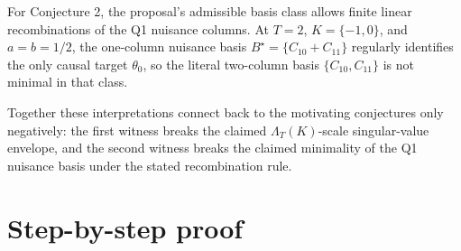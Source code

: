 \documentclass[11pt]{article}
\theoremstyle{definition}
\theoremstyle{plain}
\theoremstyle{remark}
\begin{document}
For Conjecture 2, the proposal's admissible basis class allows finite linear recombinations of the Q1 nuisance columns.
At \(T=2\), \(K=\{-1,0\}\), and \(a=b=1/2\), the one-column nuisance basis \(B^\star=\{C_{10}+C_{11}\}\) regularly identifies the only causal target \(\theta_0\), so the literal two-column basis \(\{C_{10},C_{11}\}\) is not minimal in that class.

Together these interpretations connect back to the motivating conjectures only negatively: the first witness breaks the claimed \(\Lambda_T(K)\)-scale singular-value envelope, and the second witness breaks the claimed minimality of the Q1 nuisance basis under the stated recombination rule.

\section{Step-by-step proof}
\end{document}
